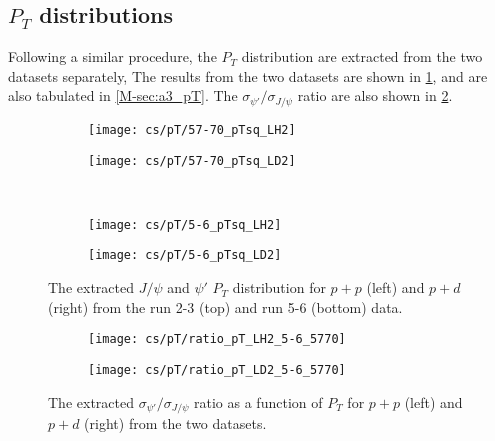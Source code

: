 \documentclass[../main.tex]{subfiles}
\begin{document}
\subsection{\texorpdfstring{$P_T$}{P\_T} distributions}
Following a similar procedure, the $P_T$ distribution are extracted from the two datasets separately,
The results from the two datasets are shown in \cref{fig:pT_distribution}, and are also tabulated in
\cref{M-sec:a3_pT}.
The $\sigma_{\psi'}/\sigma_{J/\psi}$ ratio are also shown in \cref{fig:pT_ratio}.
\begin{figure}[h!]
	\centering
	\begin{subfigure}{0.48\linewidth}
		\texttt{[image: cs/pT/57-70\_pTsq\_LH2]}
	\end{subfigure}
	\begin{subfigure}{0.48\linewidth}
		\texttt{[image: cs/pT/57-70\_pTsq\_LD2]}
	\end{subfigure}
	\\
	\begin{subfigure}{0.48\linewidth}
		\texttt{[image: cs/pT/5-6\_pTsq\_LH2]}
	\end{subfigure}
	\begin{subfigure}{0.48\linewidth}
		\texttt{[image: cs/pT/5-6\_pTsq\_LD2]}
	\end{subfigure}
	\caption{The extracted $J/\psi$ and $\psi'$ $P_T$ distribution for $p+p$ (left)
		and $p+d$ (right) from the run 2-3 (top) and run 5-6 (bottom) data.}
	\label{fig:pT_distribution}
\end{figure}
\begin{figure}[h!]
	\centering
	\begin{subfigure}{0.48\linewidth}
		\texttt{[image: cs/pT/ratio\_pT\_LH2\_5-6\_5770]}
	\end{subfigure}
	\begin{subfigure}{0.48\linewidth}
		\texttt{[image: cs/pT/ratio\_pT\_LD2\_5-6\_5770]}
	\end{subfigure}
	\caption{The extracted  $\sigma_{\psi'}/\sigma_{J/\psi}$ ratio as a function of $P_T$ for $p+p$ (left)
		and $p+d$ (right) from the two datasets.}
	\label{fig:pT_ratio}
\end{figure}
\end{document}
